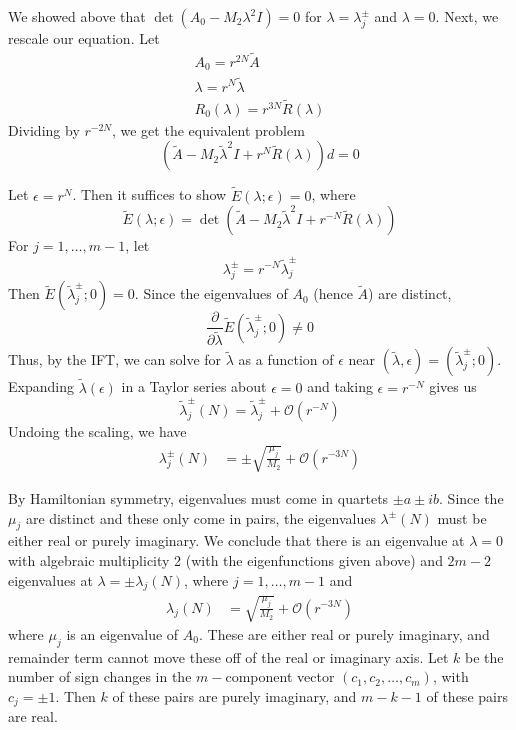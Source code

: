 \documentclass[12pt]{article}
\begin{document}
We showed above that $\det (A_0 - M_2 \lambda^2 I) = 0$ for $\lambda = \lambda_j^\pm$ and $\lambda = 0$. Next, we rescale our equation. Let
\begin{align*}
A_0 = r^{2N} \tilde{A} \\
\lambda = r^{N} \tilde{\lambda} \\
R_0(\lambda) = r^{3N} \tilde{R}(\lambda)
\end{align*}
Dividing by $r^{-2N}$, we get the equivalent problem
\[
(\tilde{A} - M_2 \tilde{\lambda}^2 I + r^{N} \tilde{R}(\lambda))d = 0
\]

Let $\epsilon = r^{N}$. Then it suffices to show $\tilde{E}(\lambda; \epsilon) = 0$, where
\[
\tilde{E}(\lambda; \epsilon) = \det(\tilde{A} - M_2 \tilde{\lambda}^2 I + r^{-N} \tilde{R}(\lambda))
\]
For $j = 1, \dots, m-1$, let 
\[
\lambda_j^\pm = r^{-N} \tilde{\lambda}_j^\pm
\]
Then $\tilde{E}(\tilde{\lambda}_j^\pm; 0) = 0$. Since the eigenvalues of $A_0$ (hence $\tilde{A}$) are distinct,
\[
\frac{\partial}{\partial \tilde{\lambda}} \tilde{E}(\tilde{\lambda}_j^\pm; 0) \neq 0
\]
Thus, by the IFT, we can solve for $\tilde{\lambda}$ as a function of $\epsilon$ near $(\tilde{\lambda}, \epsilon) = (\tilde{\lambda}_j^\pm; 0)$. Expanding $\tilde{\lambda}(\epsilon)$ in a Taylor series about $\epsilon = 0$ and taking $\epsilon = r^{-N}$ gives us
\begin{equation*}
\tilde{\lambda}_j^\pm(N) = \tilde{\lambda}_j^\pm + \mathcal{O}(r^{-N})
\end{equation*}
Undoing the scaling, we have
\begin{align*}
\lambda^\pm_j(N) &= \pm \sqrt{\frac{\mu_j}{M_2}} + \mathcal{O}(r^{-3N}) 
\end{align*}

By Hamiltonian symmetry, eigenvalues must come in quartets $\pm a \pm i b$. Since the $\mu_j$ are distinct and these only come in pairs, the eigenvalues $\lambda^\pm(N)$ must be either real or purely imaginary. We conclude that there is an eigenvalue at $\lambda = 0$ with algebraic multiplicity 2 (with the eigenfunctions given above) and $2m - 2$ eigenvalues at $\lambda = \pm \lambda_j(N)$, where $j = 1, \dots, m-1$ and 
\begin{align*}
\lambda_j(N) &= \sqrt{\frac{\mu_j}{M_2}} + \mathcal{O}(r^{-3N}) 
\end{align*}
where $\mu_j$ is an eigenvalue of $A_0$. These are either real or purely imaginary, and remainder term cannot move these off of the real or imaginary axis. Let $k$ be the number of sign changes in the $m-$component vector $(c_1, c_2, \dots, c_m)$, with $c_j = \pm 1$. Then $k$ of these pairs are purely imaginary, and $m - k - 1$ of these pairs are real.
\end{document}
